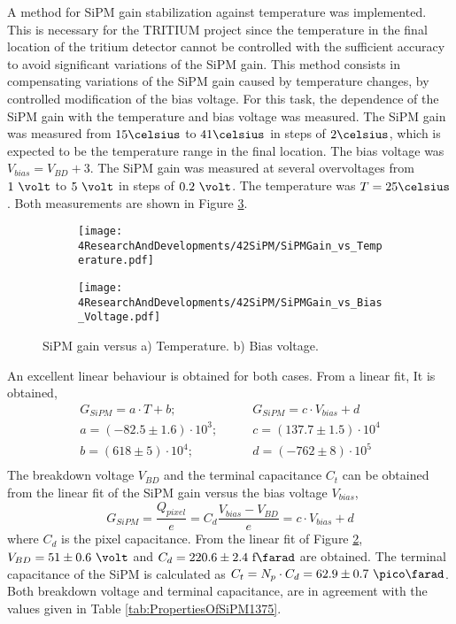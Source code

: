 A method for SiPM gain stabilization against temperature was implemented. This is necessary for the TRITIUM project since the temperature in the final location of the tritium detector cannot be controlled with the sufficient accuracy to avoid significant variations of the SiPM gain. This method consists in compensating variations of the SiPM gain caused by temperature changes, by controlled modification of the bias voltage. For this task, the dependence of the SiPM gain with the temperature and bias voltage was measured. The SiPM gain was measured from $15\celsius$ to $41\celsius$ in steps of $2\celsius$, which is expected to be the temperature range in the final location. The bias voltage was $V_{bias} = V_{BD}+3$. The SiPM gain was measured at several overvoltages from $1~\volt$ to $5~\volt$ in steps of $0.2~\volt$. The temperature was $T=25\celsius$. Both measurements are shown in Figure \ref{fig:SiPMGainDependance}.\begin{figure}
\centering
    \begin{subfigure}[b]{0.9\textwidth}
    \centering
    \texttt{[image: 4ResearchAndDevelopments/42SiPM/SiPMGain\_vs\_Temperature.pdf]}  
    \caption{\label{subfig:SiPMGainvsTemperature}}
    \end{subfigure}
    \hfill
    \begin{subfigure}[b]{0.9\textwidth}
    \centering
    \texttt{[image: 4ResearchAndDevelopments/42SiPM/SiPMGain\_vs\_Bias\_Voltage.pdf]}  
    \caption{\label{subfig:SiPMGainvsBiasVoltage}}
    \end{subfigure}
 \caption{SiPM gain versus a) Temperature. b) Bias voltage.}
 \label{fig:SiPMGainDependance}
\end{figure}
An excellent linear behaviour is obtained for both cases. From a linear fit, It is obtained,
\begin{equation*}
\begin{split}
G_{SiPM}=a \cdot{} T + b;& \qquad G_{SiPM}=c \cdot{} V_{bias} + d\\
a=\left( -82.5 \pm 1.6 \right) \cdot{} 10^{3};& \qquad c=\left( 137.7 \pm 1.5 \right) \cdot{} 10^{4}\\
b=\left( 618 \pm 5 \right) \cdot{} 10^{4};& \qquad d=\left( -762 \pm 8 \right) \cdot{} 10^{5} \\
\label{SiPMGainVSTempV}
\end{split}
\end{equation*} 
The breakdown voltage $V_{BD}$ and the terminal capacitance $C_t$ can be obtained from the linear fit of the SiPM gain versus the bias voltage $V_{bias}$,
\begin{equation}
G_{SiPM}=\frac{Q_{pixel}}{e} = C_d \frac{V_{bias}-V_{BD}}{e} = c \cdot{} V_{bias}+d
\label{SiPMGain_Capacitance}
\end{equation}
where $C_d$ is the pixel capacitance. From the linear fit of Figure \ref{subfig:SiPMGainvsBiasVoltage}, $V_{BD}=51 \pm 0.6~\volt$ and $C_d{}= 220.6 \pm 2.4~\text{f}\farad$ are obtained. The terminal capacitance of the SiPM is calculated as $C_{t}=N_{p} \cdot{} C_{d}=62.9 \pm 0.7~\pico\farad$. Both breakdown voltage and terminal capacitance, are in agreement with the values given in Table \ref{tab:PropertiesOfSiPM1375}. 

